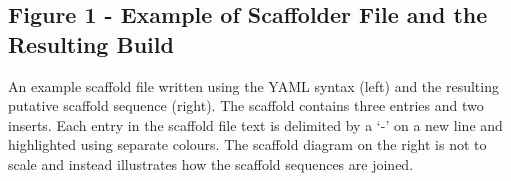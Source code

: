 \documentclass[10pt]{bmc_article}
\newenvironment{bmcformat}{\begin{raggedright}\baselineskip20pt\sloppy\setboolean{publ}{false}}{\end{raggedright}\baselineskip20pt\sloppy}
\begin{document}
\begin{bmcformat}
\subsection*{Figure 1 - Example of Scaffolder File and the Resulting Build}

An example scaffold file written using the YAML syntax \cite{yaml} (left) and
the resulting putative scaffold sequence (right). The scaffold contains three
entries and two inserts. Each entry in the scaffold file text is delimited by
a `-' on a new line and highlighted using separate colours. The scaffold
diagram on the right is not to scale and instead illustrates how the scaffold
sequences are joined. \pb

\end{bmcformat}
\end{document}
